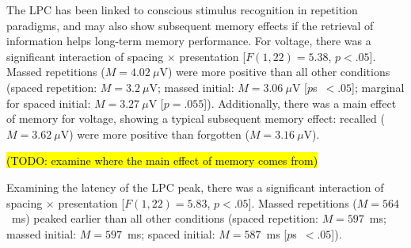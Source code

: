 

The LPC has been linked to conscious stimulus recognition in repetition paradigms, and may also show subsequent memory effects if the retrieval of information helps long-term memory performance.
For voltage, there was a significant interaction of spacing $\times$ presentation [$F(1,22)=5.38$, $p<.05$].  Massed repetitions ($M=4.02~\mu$V) were more positive than all other conditions (spaced repetition: $M=3.2~\mu$V; massed initial: $M=3.06~\mu$V [$p$s~$<.05$]; marginal for spaced initial: $M=3.27~\mu$V [$p=.055$]).  Additionally, there was a main effect of memory for voltage, showing a typical subsequent memory effect: recalled ($M=3.62~\mu$V) were more positive than forgotten ($M=3.16~\mu$V).

\hl{(TODO: examine where the main effect of memory comes from)}

Examining the latency of the LPC peak, there was a significant interaction of spacing $\times$ presentation [$F(1,22)=5.83$, $p<.05$].  Massed repetitions ($M=564$~ms) peaked earlier than all other conditions (spaced repetition: $M=597$~ms; massed initial: $M=597$~ms; spaced initial: $M=587$~ms [$p$s~$<.05$]).    

